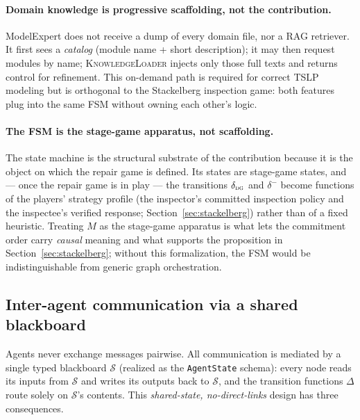 \documentclass[a4paper,fleqn]{cas-sc}
\newcommand{\Scal}{\mathcal{S}}
\begin{document}
\paragraph{Domain knowledge is progressive scaffolding, not the contribution.}
ModelExpert does not receive a dump of every domain file, nor a RAG retriever.
It first sees a \emph{catalog} (module name + short description); it may then
request modules by name; \textsc{KnowledgeLoader} injects only those full
texts and returns control for refinement. This on-demand path is required for
correct TSLP modeling but is orthogonal to the Stackelberg inspection game:
both features plug into the same FSM without owning each other's logic.

\paragraph{The FSM is the stage-game apparatus, not scaffolding.} The state
machine is the structural substrate of the contribution because it is the
object on which the repair game is defined. Its states are stage-game states,
and --- once the repair game is in play --- the transitions
$\delta_{\textsc{dg}}$ and $\delta^{-}$ become functions of the players'
strategy profile (the inspector's committed inspection policy and the
inspectee's verified response; Section~\ref{sec:stackelberg}) rather than of a
fixed heuristic. Treating $M$
as the stage-game apparatus is what lets the commitment order carry
\emph{causal} meaning and what supports the proposition in
Section~\ref{sec:stackelberg}; without this formalization, the FSM would be
indistinguishable from generic graph orchestration.

\subsection{Inter-agent communication via a shared blackboard}
\label{sec:comm}

Agents never exchange messages pairwise. All communication is mediated by a
single typed blackboard $\Scal$ (realized as the \texttt{AgentState} schema):
every node reads its inputs from $\Scal$ and writes its outputs back to
$\Scal$, and the transition functions $\Delta$ route solely on $\Scal$'s
contents. This \emph{shared-state, no-direct-links} design has three
consequences.
\end{document}
